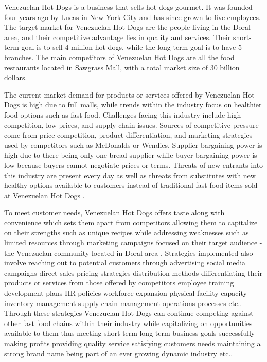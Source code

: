  

Venezuelan Hot Dogs is a business that sells hot dogs gourmet. It was founded four years ago by Lucas in New York City and has since grown to five employees. The target market for Venezuelan Hot Dogs are the people living in the Doral area, and their competitive advantage lies in quality and services. Their short-term goal is to sell 4 million hot dogs, while the long-term goal is to have 5 branches. The main competitors of Venezuelan Hot Dogs are all the food restaurants located in Sawgrass Mall, with a total market size of 30 billion dollars.

The current market demand for products or services offered by Venezuelan Hot Dogs is high due to full malls, while trends within the industry focus on healthier food options such as fast food. Challenges facing this industry include high competition, low prices, and supply chain issues. Sources of competitive pressure come from price competition, product differentiation, and marketing strategies used by competitors such as McDonalds or Wendies. Supplier bargaining power is high due to there being only one bread supplier while buyer bargaining power is low because buyers cannot negotiate prices or terms. Threats of new entrants into this industry are present every day as well as threats from substitutes with new healthy options available to customers instead of traditional fast food items sold at Venezuelan Hot Dogs . 

To meet customer needs, Venezuelan Hot Dogs offers taste along with convenience which sets them apart from competitors allowing them to capitalize on their strengths such as unique recipes while addressing weaknesses such as limited resources through marketing campaigns focused on their target audience -the Venezuelan community located in Doral area-. Strategies implemented also involve reaching out to potential customers through advertising social media campaigns direct sales pricing strategies distribution methods differentiating their products or services from those offered by competitors employee training development plans HR policies workforce expansion physical facility capacity inventory management supply chain management operations processes etc..   Through these strategies Venezuelan Hot Dogs can continue competing against other fast food chains within their industry while capitalizing on opportunities available to them thus meeting short-term long-term business goals successfully making profits providing quality service satisfying customers needs maintaining a strong brand name being part of an ever growing dynamic industry etc..